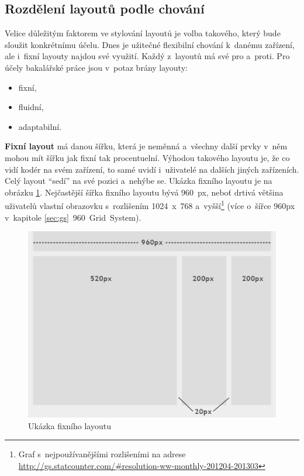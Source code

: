 \documentclass[thesis=B,czech]{FITthesis}[2012/06/26]
\begin{document}
\subsection{Rozdělení layoutů podle chování}

Velice důležitým faktorem ve stylování layoutů je volba takového, který bude sloužit konkrétnímu účelu. Dnes je užitečné flexibilní chování k~danému zařízení, ale i~fixní layouty najdou své využití. Každý z~layoutů má své pro a~proti. Pro účely bakalářské práce jsou v~potaz brány layouty:

\begin{itemize}
 \item fixní,
 \item fluidní,
 \item adaptabilní.
\end{itemize}
\textbf{Fixní layout} má danou šířku, která je neměnná a~všechny další prvky v~něm mohou mít šířku jak fixní tak procentuelní. Výhodou takového layoutu je, že co vidí kodér na svém zařízení, to samé uvidí i~uživatelé na dalších jiných zařízeních\cite{fix}. Celý layout “sedí” na své pozici a~nehýbe se. Ukázka fixního layoutu je na obrázku \ref{imgFix}. Nejčastější šířka fixního layoutu bývá 960~px, neboť drtivá většina uživatelů vlastní obrazovku s~rozlišením 1024~x~768 a~vyšší\footnote{Graf s~nejpoužívanějšími rozlišeními na adrese  \url{http://gs.statcounter.com/\#resolution-ww-monthly-201204-201303}} (více o~šířce 960px v~kapitole \ref{sec:gs}~960~Grid~System). 

\begin{figure}[h]
	\begin{center}
	\includegraphics[scale=0.5]{images/image06.png}
	\end{center}
	\caption{Ukázka fixního layoutu\cite{fix}}
	\label{imgFix}
\end{figure}
\end{document}

